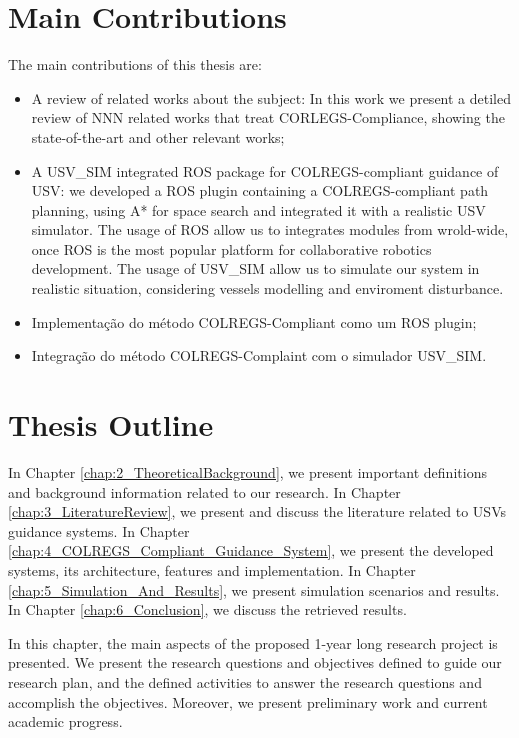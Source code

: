     \section{Main Contributions}
    
    The main contributions of this thesis are:
    \begin{itemize}
        \item A review of related works about the subject: In this work we present a detiled review of NNN\todo{} related works that treat CORLEGS-Compliance, showing the state-of-the-art and other relevant works;
        \item A USV\_SIM integrated ROS package for COLREGS-compliant guidance of \ac{USV}: we developed a ROS plugin containing a COLREGS-compliant path planning, using A* for space search and integrated it with a realistic \ac{USV} simulator. The usage of ROS allow us to integrates modules from wrold-wide, once ROS is the most popular platform for collaborative robotics development. The usage of USV\_SIM allow us to simulate our system in realistic situation, considering vessels modelling and enviroment disturbance.
        \item Implementação do método COLREGS-Compliant como um ROS plugin;
        \item Integração do método COLREGS-Complaint com o simulador USV\_SIM.
    \end{itemize}

    \section{Thesis Outline}
    
    In Chapter \ref{chap:2_TheoreticalBackground}, we present important definitions and background information related to our research. In Chapter \ref{chap:3_LiteratureReview}, we present and discuss the literature related to \acp{USV} guidance systems. 
    In Chapter \ref{chap:4_COLREGS_Compliant_Guidance_System}, we present the developed systems, its architecture, features and implementation. In Chapter \ref{chap:5_Simulation_And_Results}, we present simulation scenarios and results. In Chapter \ref{chap:6_Conclusion}, we discuss the retrieved results.
    
    
    In this chapter, the main aspects of the proposed 1-year long research project is presented. We present the research questions and objectives defined to guide our research plan, and the defined activities to answer the research questions and accomplish the objectives. Moreover, we present preliminary work and current academic progress.
    
